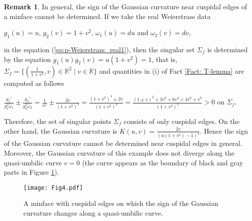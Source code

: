 \documentclass[11pt,reqno]{amsart}
\theoremstyle{plain} %
\theoremstyle{definition}
\newtheorem{remark}[theorem]{Remark}
\begin{document}
\begin{remark}\label{sign of CE}
In general, the sign of the Gaussian curvature near cuspidal edges of a minface cannot be determined. If we take the real Weierstrass data
\begin{center}
$g_1(u)=u$, $g_2(v)=1+v^2$, $\omega_1(u)=du$ and $\omega_2(v)=dv$, 
\end{center}
in the equation (\ref{eq:p-Weierstrass_real1}),
then the singular set $\Sigma_f$ is determined by the equation $g_1(u)g_2(v)=u(1+v^2)=1$, that is, $\Sigma_f=\{(\frac{1}{1+v^2},v)\in \mathbb{R}^2\mid v \in \mathbb{R}\}$ and quantities in (i) of Fact \ref{Fact: T-lemma} are computed as follows
\begin{center}
$\frac{g_1'}{g_1^2\hat{\omega}_1}\pm \frac{g_2'}{g_2^2\hat{\omega}_2}=\frac{1}{u^2}\pm\frac{2v}{(1+v^2)^2}=\frac{(1+v^2)^4\pm2v}{(1+v^2)^2}=\frac{(1\pm v)^2+3v^2+6v^4+4v^6+v^8}{(1+v^2)^2}>0$ on  $\Sigma_f$.
\end{center}
Therefore, the set of singular points $\Sigma_f$ consists of only cuspidal edges. On the other hand, the Gaussian curvature is $K(u,v)=\frac{2v}{(u(1+v^2)-1)^4}$. Hence the sign of the Gaussian curvature cannot be determined near cuspidal edges in general. Moreover, the Gaussian curvature of this example does not diverge along the quasi-umbilic curve $v=0$ (the curve appears as the boundary of black and gray parts in Figure \ref{Fig4}).
\begin{figure}[htbp]
 \vspace{-0.45cm}
\begin{center}
\texttt{[image: Fig4.pdf]}
 \vspace{0cm}
\caption{A minface with cuspidal edges on which the sign of the Gaussian curvature changes along a quasi-umbilic curve.}\label{Fig4}
\end{center}
\end{figure}
\end{remark}
\end{document}
